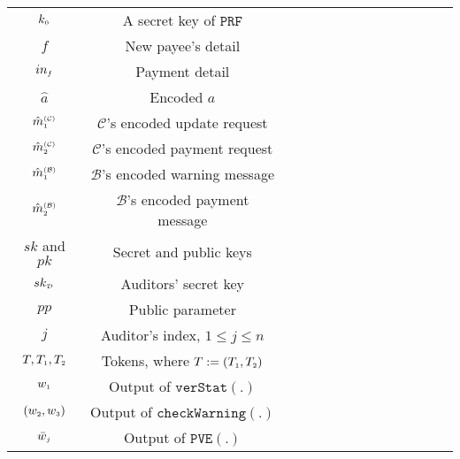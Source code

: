 \begin{table*}[!htb]
\begin{scriptsize}
\begin{center}
{{\begin{tabular}{|c|c|c|c|c|c|c|c|c|c|c|c|c|c|}
\cellcolor{gray!20}\scriptsize$ k_{\scriptscriptstyle 0}$ &\cellcolor{gray!20}\scriptsize   A secret key of $\mathtt{PRF}$\\ 
%               
\cellcolor{white!20}\scriptsize$f$ &\cellcolor{white!20}\scriptsize New payee’s detail  \\ 
\cellcolor{gray!20}\scriptsize$in_{\scriptscriptstyle f}$ &\cellcolor{gray!20}\scriptsize Payment detail \\ 
%
  \cellcolor{white!20}\scriptsize$\hat a$ &\cellcolor{white!20}\scriptsize Encoded $a$ \\     
%
\cellcolor{gray!20}\scriptsize$\hat {m}^{\scriptscriptstyle(\mathcal{C})}_{\scriptscriptstyle 1}$ &\cellcolor{gray!20}\scriptsize $\mathcal{C}$'s encoded update request\\     
%
\cellcolor{white!20}\scriptsize$\hat {m}^{\scriptscriptstyle(\mathcal{C})}_{\scriptscriptstyle 2}$ &\cellcolor{white!20}\scriptsize $\mathcal{C}$'s encoded payment request\\     
%      
\cellcolor{gray!20}\scriptsize$\hat {m}^{\scriptscriptstyle(\mathcal{B})}_{\scriptscriptstyle 1}$ &\cellcolor{gray!20}\scriptsize $\mathcal{B}$'s encoded warning message\\     
%
\cellcolor{white!20}\scriptsize$\hat {m}^{\scriptscriptstyle(\mathcal{B})}_{\scriptscriptstyle 2}$ &\cellcolor{white!20}\scriptsize $\mathcal{B}$'s encoded payment message\\     
%          
     \cellcolor{gray!20}\scriptsize$sk$ and $pk$ &\cellcolor{gray!20}\scriptsize Secret  and public keys\\     
%
   \cellcolor{white!20}\scriptsize$sk_{\scriptscriptstyle\mathcal{D}}$ &\cellcolor{white!20}\scriptsize Auditors' secret key\\     
%    
\cellcolor{gray!20}\scriptsize$pp$ &\cellcolor{gray!20}\scriptsize Public parameter\\  
%
\cellcolor{white!20}\scriptsize$j$ &\cellcolor{white!20}\scriptsize  Auditor's index,  $1\leq j\leq n$ \\ 
%
\cellcolor{gray!20}\scriptsize$T, T_{\scriptscriptstyle 1},T_{\scriptscriptstyle 2}$ &\cellcolor{gray!20}\scriptsize  Tokens, where  $T:=( T_{\scriptscriptstyle 1},T_{\scriptscriptstyle 2})$\\ 
%
\cellcolor{white!20}\scriptsize$w_{\scriptscriptstyle 1}$ &\cellcolor{white!20}\scriptsize  Output of $\mathtt{verStat}(.)$\\ 
%
\cellcolor{gray!20}\scriptsize$(w_{\scriptscriptstyle 2},w_{\scriptscriptstyle 3})$ &\cellcolor{gray!20}\scriptsize  Output of $\mathtt{checkWarning}(.)$\\ 
%
\cellcolor{white!20}\scriptsize$\bar{w}_{\scriptscriptstyle j}$ &\cellcolor{white!20}\scriptsize  Output of $\mathtt{PVE}(.)$\\ 

\end{tabular}}}
\end{center}
\end{scriptsize}
\end{table*}
